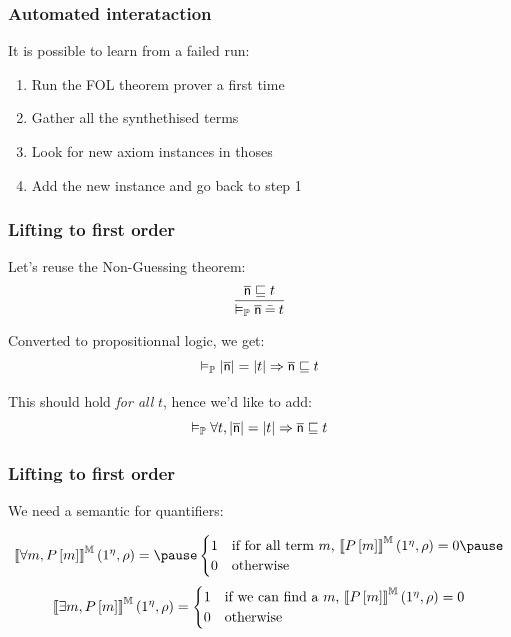 \documentclass[aspectratio=169]{beamer}
\begin{document}
\begin{frame}
  \frametitle{Automated interataction}

  It is possible to learn from a failed run:
  \pause

  \begin{enumerate}
    \item Run the FOL theorem prover a first time\pause
    \item Gather all the synthethised terms\pause
    \item Look for new axiom instances in thoses\pause
    \item Add the new instance and go back to step 1
  \end{enumerate}

\end{frame}

\begin{frame}
  \frametitle{Lifting to first order}

  Let's reuse the Non-Guessing theorem:
  \[
    \frac{\overline{\mathsf{n}}\sqsubseteq t}{\vDash_{\mathbb{P}} \overline{\mathsf{n}} \mathbin{\bar{=}} t}
  \]\pause

  Converted to propositionnal logic, we get:
  \[
    \validp \meval{\n} = \meval{t} \Rightarrow \n \sqsubseteq t
  \]\pause

  This should hold \emph{for all} $t$, hence we'd like to add:
  \[
    \validp \forall t, \meval{\n} = \meval{t} \Rightarrow \n \sqsubseteq t
  \]\pause
\end{frame}

\begin{frame}
  \frametitle{Lifting to first order}

  We need a semantic for quantifiers:

  \[
    \mevalbc{\forall m, P\left[ m \right]}\left( 1^\eta, \rho \right) =\pause \begin{cases}
      1 &\text{if for all term $m$, } \mevalbc{P\left[ m \right]}\left( 1^\eta, \rho \right) = 0\pause\\
      0 & \text{otherwise}
    \end{cases}
  \]\pause
  \[
    \mevalbc{\exists m, P\left[ m \right]}\left( 1^\eta, \rho \right) = \begin{cases}
      1 &\text{if we can find a $m$, } \mevalbc{P\left[ m \right]}\left( 1^\eta, \rho \right) = 0\\
      0 & \text{otherwise}
    \end{cases}
  \]  

\end{frame}
\end{document}
